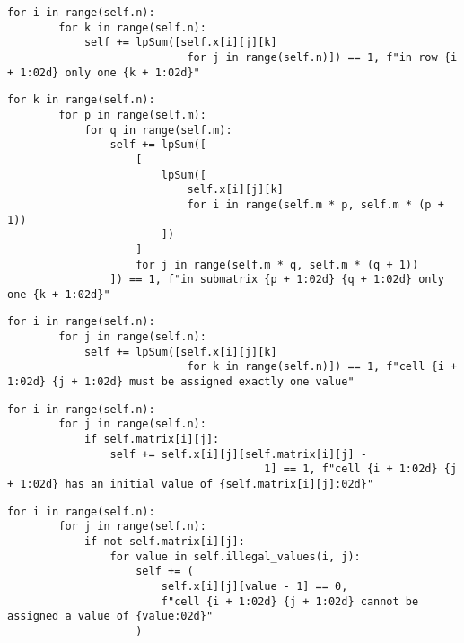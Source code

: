 \documentclass[12pt]{article}
\begin{document}
\begin{lstlisting}[caption={Declaring that there should only be one \textit{k} in each row}]
    for i in range(self.n):
        for k in range(self.n):
            self += lpSum([self.x[i][j][k]
                            for j in range(self.n)]) == 1, f"in row {i + 1:02d} only one {k + 1:02d}"
\end{lstlisting}

\begin{lstlisting}[caption={Declaring that there should only be one \textit{k} in each submatrix}]
    for k in range(self.n):
        for p in range(self.m):
            for q in range(self.m):
                self += lpSum([
                    [
                        lpSum([
                            self.x[i][j][k]
                            for i in range(self.m * p, self.m * (p + 1))
                        ])
                    ]
                    for j in range(self.m * q, self.m * (q + 1))
                ]) == 1, f"in submatrix {p + 1:02d} {q + 1:02d} only one {k + 1:02d}"
\end{lstlisting}

\begin{lstlisting}[caption={Declaring that there should only be one \textit{k} in each cell}]
    for i in range(self.n):
        for j in range(self.n):
            self += lpSum([self.x[i][j][k]
                            for k in range(self.n)]) == 1, f"cell {i + 1:02d} {j + 1:02d} must be assigned exactly one value"
\end{lstlisting}

\pagebreak

\begin{lstlisting}[caption={Declaring that some cells have already received some initial values}]
    for i in range(self.n):
        for j in range(self.n):
            if self.matrix[i][j]:
                self += self.x[i][j][self.matrix[i][j] -
                                        1] == 1, f"cell {i + 1:02d} {j + 1:02d} has an initial value of {self.matrix[i][j]:02d}"
\end{lstlisting}

\begin{lstlisting}[caption={Performing some preprocessing and invalidating some of the candidate values of each cell}]
    for i in range(self.n):
        for j in range(self.n):
            if not self.matrix[i][j]:
                for value in self.illegal_values(i, j):
                    self += (
                        self.x[i][j][value - 1] == 0,
                        f"cell {i + 1:02d} {j + 1:02d} cannot be assigned a value of {value:02d}"
                    )
\end{lstlisting}
\end{document}

